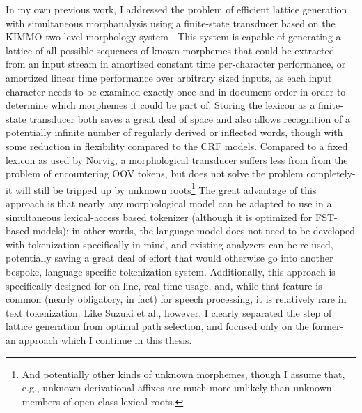 In my own previous work\cite{kearsley13}, I addressed the problem of efficient lattice generation with simultaneous morphanalysis using a finite-state transducer based on the KIMMO two-level morphology system \cite{koskenniemi84}. This system is capable of generating a lattice of all possible sequences of known morphemes that could be extracted from an input stream in amortized constant time per-character performance, or amortized linear time performance over arbitrary sized inputs, as each input character needs to be examined exactly once and in document order in order to determine which morphemes it could be part of\cite{kearsley13}. Storing the lexicon as a finite-state transducer both saves a great deal of space and also allows recognition of a potentially infinite number of regularly derived or inflected words, though with some reduction in flexibility compared to the CRF models. Compared to a fixed lexicon as used by Norvig\cite{norvig14}, a morphological transducer suffers less from from the problem of encountering OOV tokens, but does not solve the problem completely- it will still be tripped up by unknown roots\footnote{And potentially other kinds of unknown morphemes, though I assume that, e.g., unknown derivational affixes are much more unlikely than unknown members of open-class lexical roots.}
The great advantage of this approach is that nearly any morphological model can be adapted to use in a simultaneous lexical-access based tokenizer (although it is optimized for FST-based models); in other words, the language model does not need to be developed with tokenization specifically in mind, and existing analyzers can be re-used, potentially saving a great deal of effort that would otherwise go into another bespoke, language-specific tokenization system. Additionally, this approach is specifically designed for on-line, real-time usage, and, while that feature is common (nearly obligatory, in fact) for speech processing, it is relatively rare in text tokenization\cite{aken11}. Like Suzuki et al.\cite{suzuki00}, however, I clearly separated the step of lattice generation from optimal path selection, and focused only on the former- an approach which I continue in this thesis.




